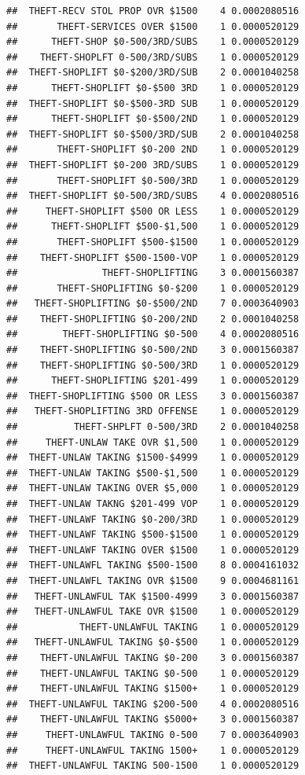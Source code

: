 \documentclass[]{book}
\begin{document}
\begin{verbatim}
##  THEFT-RECV STOL PROP OVR $1500    4 0.0002080516
##       THEFT-SERVICES OVER $1500    1 0.0000520129
##      THEFT-SHOP $0-500/3RD/SUBS    1 0.0000520129
##    THEFT-SHOPLFT 0-500/3RD/SUBS    1 0.0000520129
##  THEFT-SHOPLIFT $0-$200/3RD/SUB    2 0.0001040258
##      THEFT-SHOPLIFT $0-$500 3RD    1 0.0000520129
##  THEFT-SHOPLIFT $0-$500-3RD SUB    1 0.0000520129
##      THEFT-SHOPLIFT $0-$500/2ND    1 0.0000520129
##  THEFT-SHOPLIFT $0-$500/3RD/SUB    2 0.0001040258
##       THEFT-SHOPLIFT $0-200 2ND    1 0.0000520129
##  THEFT-SHOPLIFT $0-200 3RD/SUBS    1 0.0000520129
##       THEFT-SHOPLIFT $0-500/3RD    1 0.0000520129
##  THEFT-SHOPLIFT $0-500/3RD/SUBS    4 0.0002080516
##     THEFT-SHOPLIFT $500 OR LESS    1 0.0000520129
##      THEFT-SHOPLIFT $500-$1,500    1 0.0000520129
##       THEFT-SHOPLIFT $500-$1500    1 0.0000520129
##    THEFT-SHOPLIFT $500-1500-VOP    1 0.0000520129
##               THEFT-SHOPLIFTING    3 0.0001560387
##       THEFT-SHOPLIFTING $0-$200    1 0.0000520129
##   THEFT-SHOPLIFTING $0-$500/2ND    7 0.0003640903
##    THEFT-SHOPLIFTING $0-200/2ND    2 0.0001040258
##        THEFT-SHOPLIFTING $0-500    4 0.0002080516
##    THEFT-SHOPLIFTING $0-500/2ND    3 0.0001560387
##    THEFT-SHOPLIFTING $0-500/3RD    1 0.0000520129
##      THEFT-SHOPLIFTING $201-499    1 0.0000520129
##  THEFT-SHOPLIFTING $500 OR LESS    3 0.0001560387
##   THEFT-SHOPLIFTING 3RD OFFENSE    1 0.0000520129
##          THEFT-SHPLFT 0-500/3RD    2 0.0001040258
##     THEFT-UNLAW TAKE OVR $1,500    1 0.0000520129
##  THEFT-UNLAW TAKING $1500-$4999    1 0.0000520129
##  THEFT-UNLAW TAKING $500-$1,500    1 0.0000520129
##  THEFT-UNLAW TAKING OVER $5,000    1 0.0000520129
##  THEFT-UNLAW TAKNG $201-499 VOP    1 0.0000520129
##  THEFT-UNLAWF TAKING $0-200/3RD    1 0.0000520129
##  THEFT-UNLAWF TAKING $500-$1500    1 0.0000520129
##  THEFT-UNLAWF TAKING OVER $1500    1 0.0000520129
##  THEFT-UNLAWFL TAKING $500-1500    8 0.0004161032
##  THEFT-UNLAWFL TAKING OVR $1500    9 0.0004681161
##   THEFT-UNLAWFUL TAK $1500-4999    3 0.0001560387
##   THEFT-UNLAWFUL TAKE OVR $1500    1 0.0000520129
##           THEFT-UNLAWFUL TAKING    1 0.0000520129
##   THEFT-UNLAWFUL TAKING $0-$500    1 0.0000520129
##    THEFT-UNLAWFUL TAKING $0-200    3 0.0001560387
##    THEFT-UNLAWFUL TAKING $0-500    1 0.0000520129
##    THEFT-UNLAWFUL TAKING $1500+    1 0.0000520129
##  THEFT-UNLAWFUL TAKING $200-500    4 0.0002080516
##    THEFT-UNLAWFUL TAKING $5000+    3 0.0001560387
##     THEFT-UNLAWFUL TAKING 0-500    7 0.0003640903
##     THEFT-UNLAWFUL TAKING 1500+    1 0.0000520129
##  THEFT-UNLAWFUL TAKING 500-1500    1 0.0000520129

\end{verbatim}
\end{document}
